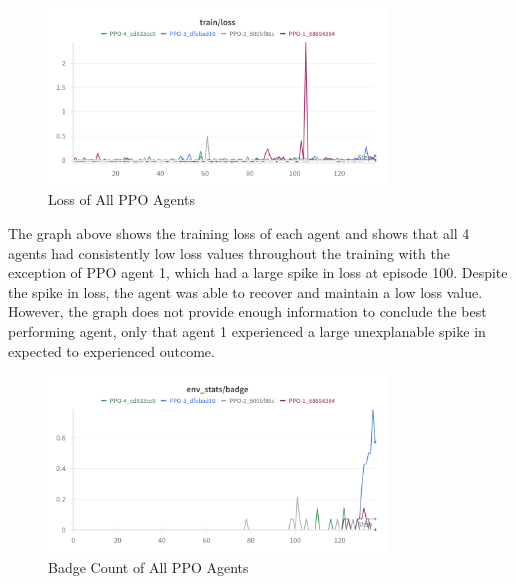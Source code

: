 \begin{figure}[H]
    \centering
    \includegraphics[width=0.8\textwidth]{figures/PPO_loss.png}
    \caption{Loss of All PPO Agents}
    \label{fig:agent_eval_all_ppo_loss}
\end{figure}

The graph above shows the training loss of each agent and shows that all 4 agents had consistently low loss values throughout the training with the exception of PPO agent 1, which had a large spike in loss at episode 100. Despite the spike in loss, the agent was able to recover and maintain a low loss value. However, the graph does not provide enough information to conclude the best performing agent, only that agent 1 experienced a large unexplanable spike in expected to experienced outcome. 

\begin{figure}[H]
    \centering
    \includegraphics[width=0.8\textwidth]{figures/PPO_Badge.png}
    \caption{Badge Count of All PPO Agents}
    \label{fig:agent_eval_all_ppo_badge}
\end{figure}

